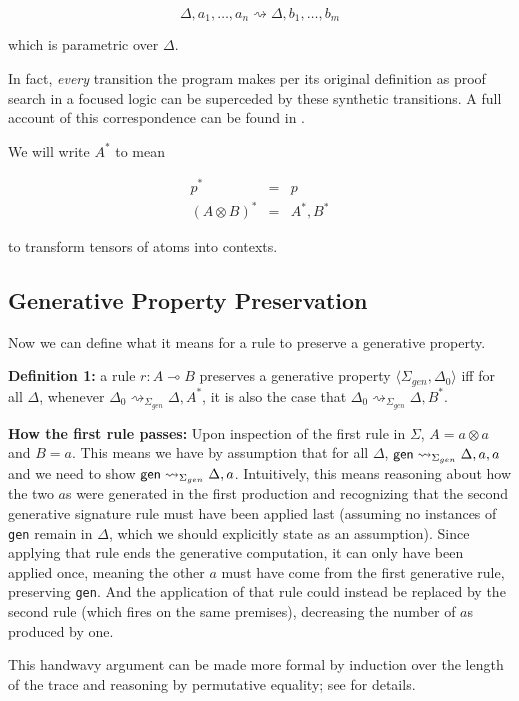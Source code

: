 \documentclass[fullpage, 11pt]{article}
\newcommand{\lolli}{\multimap}
\newcommand{\tensor}{\otimes}
\newcommand{\stepsto}{\rightsquigarrow}
\begin{document}
\[
\Delta, a_1, \dots, a_n \stepsto \Delta, b_1, \dots, b_m
\]

which is parametric over $\Delta$.

In fact, {\em every} transition the program makes per its original
definition as proof search in a focused logic can be superceded by these
synthetic transitions. A full account of this correspondence can be found
in \cite{deyoung12linear}.

We will write $A^*$ to mean

\begin{eqnarray*}
p^* &=& p \\
(A \tensor B)^* &=& A^*, B^*
\end{eqnarray*}

to transform tensors of atoms into contexts.

\subsection{Generative Property Preservation}

Now we can define what it means for a rule to preserve a generative
property.

{\bf Definition 1:} a rule $r : A \lolli B$ preserves a generative
property $\langle \Sigma_{gen}, \Delta_0 \rangle$ 
iff for all $\Delta$, whenever $\Delta_0 \stepsto_{\Sigma_{gen}} \Delta,
A^*$, it is also the case that $\Delta_0 \stepsto_{\Sigma_{gen}} \Delta,
B^*$.

{\bf How the first rule passes:} Upon inspection of the first rule in
$\Sigma$, $A = a \tensor a$ and $B = a$. This means we have by assumption
that for all $\Delta$, ${\sf gen}\stepsto_{\Sigma_{gen}} \Delta, a, a$ and
we need to show ${\sf gen} \stepsto_{\Sigma_{gen}} \Delta, a$. Intuitively,
this means reasoning about how the two $a$s were generated in the first
production and recognizing that the second generative signature rule must
have been applied last (assuming no instances of \verb|gen| remain in
$\Delta$, which we should explicitly state as an assumption). Since
applying that rule ends the generative computation, it can only have been
applied once, meaning the other $a$ must have come from the first
generative rule, preserving \verb|gen|. And the application of that rule
could instead be replaced by the second rule (which fires on the same
premises), decreasing the number of $a$s produced by one.

This handwavy argument can be made more formal by induction over the length
of the trace and reasoning by permutative equality; see
\cite{simmons12thesis} for details.
\end{document}

